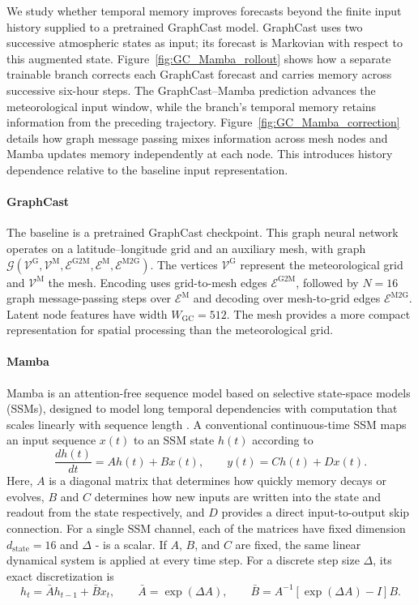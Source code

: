 \documentclass{article}
\begin{document}
We study whether temporal memory improves forecasts beyond the finite input history supplied to a pretrained GraphCast model. GraphCast uses two successive atmospheric states as input; its forecast is Markovian with respect to this augmented state. Figure~\ref{fig:GC_Mamba_rollout} shows how a separate trainable branch corrects each GraphCast forecast and carries memory across successive six-hour steps. The GraphCast--Mamba prediction advances the meteorological input window, while the branch's temporal memory retains information from the preceding trajectory. Figure~\ref{fig:GC_Mamba_correction} details how graph message passing mixes information across mesh nodes and Mamba updates memory independently at each node. This introduces history dependence relative to the baseline input representation.

\paragraph{GraphCast}
The baseline is a pretrained GraphCast checkpoint. This graph neural network operates on a latitude--longitude grid and an auxiliary mesh, with graph $\mathcal{G}(\mathcal{V}^{\textrm{G}},\mathcal{V}^{\textrm{M}},\mathcal{E}^{\textrm{G2M}},\mathcal{E}^{\textrm{M}},\mathcal{E}^{\textrm{M2G}})$. The vertices $\mathcal{V}^{\textrm{G}}$ represent the meteorological grid and $\mathcal{V}^{\textrm{M}}$ the mesh. Encoding uses grid-to-mesh edges $\mathcal{E}^{\textrm{G2M}}$, followed by $N=16$ graph message-passing steps over $\mathcal{E}^{\textrm{M}}$ and decoding over mesh-to-grid edges $\mathcal{E}^{\textrm{M2G}}$. Latent node features have width $W_{\textrm{GC}}=512$. The mesh provides a more compact representation for spatial processing than the meteorological grid.

\paragraph{Mamba}
Mamba is an attention-free sequence model based on selective state-space models (SSMs), designed to model long temporal dependencies with computation that scales linearly with sequence length \citep{gu2023mamba}. A conventional continuous-time SSM maps an input sequence $x(t)$ to an SSM state $h(t)$ according to
\begin{equation}
    \frac{d h(t)}{dt} = A h(t) + B x(t),
    \qquad
    y(t) = C h(t) + D x(t).
\end{equation}
Here, $A$ is a diagonal matrix that determines how quickly memory decays or evolves, $B$ and $C$ determines how new inputs are written into the state and readout from the state respectively, and $D$ provides a direct input-to-output skip connection. For a single SSM channel, each of the matrices have fixed dimension $d_{\textrm{state}}=16$ and $\Delta$ - is a scalar. If $A$, $B$, and $C$ are fixed, the same linear dynamical system is applied at every time step. For a discrete step size $\Delta$, its exact discretization is
\begin{equation}
    h_t = \bar{A} h_{t-1} + \bar{B}x_t,
    \qquad
    \bar{A} = \exp(\Delta A),
    \qquad
    \bar{B} = A^{-1}\left[\exp(\Delta A)-I\right]B.
\end{equation}
\end{document}
